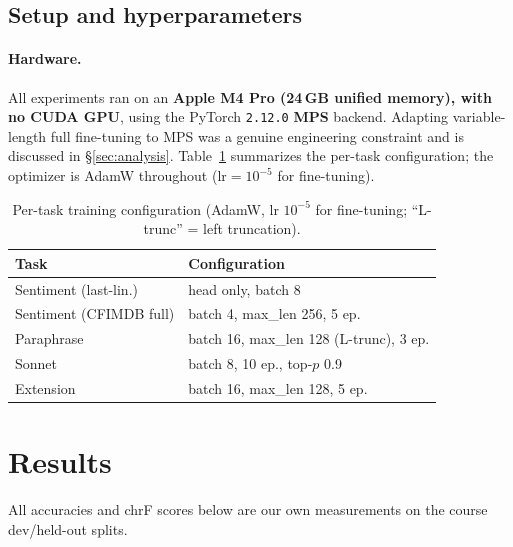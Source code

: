 \documentclass[10pt,twocolumn]{article}
\begin{document}
\subsection{Setup and hyperparameters}
\paragraph{Hardware.} All experiments ran on an \textbf{Apple M4 Pro (24\,GB
unified memory), with no CUDA GPU}, using the PyTorch \texttt{2.12.0} \textbf{MPS}
backend. Adapting variable-length full fine-tuning to MPS was a genuine
engineering constraint and is discussed in \S\ref{sec:analysis}. Table~\ref{tab:hp}
summarizes the per-task configuration; the optimizer is AdamW throughout
($\mathrm{lr}=10^{-5}$ for fine-tuning).

\begin{table}[t]
\centering
\small
\begin{tabular}{@{}ll@{}}
\toprule
\textbf{Task} & \textbf{Configuration} \\
\midrule
Sentiment (last-lin.) & head only, batch 8 \\
Sentiment (CFIMDB full) & batch 4, max\_len 256, 5 ep. \\
Paraphrase & batch 16, max\_len 128 (L-trunc), 3 ep. \\
Sonnet & batch 8, 10 ep., top-$p$ 0.9 \\
Extension & batch 16, max\_len 128, 5 ep. \\
\bottomrule
\end{tabular}
\caption{Per-task training configuration (AdamW, lr $10^{-5}$ for fine-tuning;
``L-trunc'' = left truncation).}
\label{tab:hp}
\end{table}

\section{Results}
All accuracies and chrF scores below are our own measurements on the course
dev/held-out splits.
\end{document}
